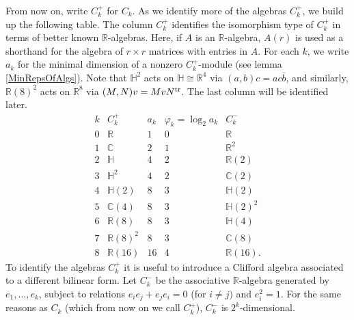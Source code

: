 \documentclass{article}
\newcommand{\C}{\mathbb{C}}
\newcommand{\R}{\mathbb{R}}
\begin{document}
From now on, write $C^+_k$ for $C_k$. As we identify more of the algebras $C^+_k$, we build up the following table. The column $C^+_k$ identifies the isomorphism type of $C^+_k$ in terms of better known $\R$-algebras. Here, if $A$ is an $\R$-algebra, $A(r)$ is used as a shorthand for the algebra of $r\times r$ matrices with entries in $A$. For each $k$, we write $a_k$ for the minimal dimension of a nonzero $C^+_k$-module (see lemma \ref{MinRepsOfAlgs}). Note that $\mathbb{H}^2$ acts on $\mathbb{H}\cong\R^4$ via $(a,b)c=ac\overline{b}$, and similarly, $\R(8)^2$ acts on $\R^8$ via $(M,N)v=MvN^\textup{tr}$. The last column will be identified later.
\[\begin{array}{c|ccccc} %
k& C^+_k& a_k & \varphi_k = \log_2 a_k &C^-_k \\\hline
0 & \R & 1 & 0 & \R \\
1 & \C & 2 & 1 & \R^2 \\
2 & \mathbb{H} & 4 & 2 & \R(2) \\
3 & \mathbb{H}^2 & 4 & 2 & \C(2) \\
4 & \mathbb{H}(2) & 8 & 3 & \mathbb{H}(2) \\
5 & \C(4) & 8 & 3 & \mathbb{H}(2)^2 \\
6 & \R(8) & 8 & 3 & \mathbb{H}(4) \\
7 & \R(8)^2 & 8 & 3 & \C(8) \\
8 & \R(16) & 16 & 4 & \R(16).
\end{array}\] %
To identify the algebras $C_k^+$ it is useful to introduce a Clifford algebra associated to a different bilinear form. Let $C_k^-$ be the associative $\R$-algebra generated by $e_1, \ldots, e_k$, subject to relations $e_ie_j+e_je_i=0$ (for $i\neq j)$ and $e_i^2=1$. For the same reasons as $C_k$ (which from now on we call $C_k^+$), $C_k^-$ is $2^k$-dimensional.
\end{document}
